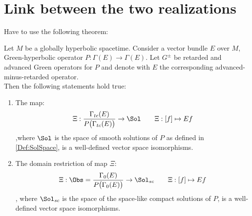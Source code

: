 \documentclass[Main]{subfiles}
\begin{document}
		
\section{Link between the two realizations}	
	Have to use the following theorem:
	\begin{theorem}
					Let $M$ be a globally hyperbolic spacetime. Consider a vector bundle $E$ over $M$, Green-hyperbolic operator $P: \Gamma(E)\rightarrow \Gamma(E)$.
				Let $G^\pm$ be retarded and advanced Green operators for $P$ and denote with $E$ the corresponding advanced-minus-retarded operator.\\
				Then the following statements hold true:
					\begin{enumerate}
						\item The map:
							\begin{equation}
								 \Xi : \frac{\Gamma_{tc}(E)}{P \big( \Gamma_{tc}(E)\big)} \rightarrow  \Sol \qquad \Xi: [f] \mapsto E f
							\end{equation}
							,where $\Sol$ is the space of smooth solutions of $P$ as defined in \ref{Def:SolSpace},
							is a well-defined vector space isomorphisms.
						\item The domain restriction of map $\Xi$:
							\begin{equation}
								 \Xi : \Obs= \frac{\Gamma_{0}(E)}{P \big( \Gamma_{0}(E)\big)} \rightarrow  \Sol_{sc} \qquad \Xi: [f] \mapsto E f
							\end{equation}
							, where $\Sol_{sc}$ is the space of the space-like compact solutions of $P$,
							is a well-defined vector space isomorphisms.
					\end{enumerate}
	\end{theorem}
\end{document}
